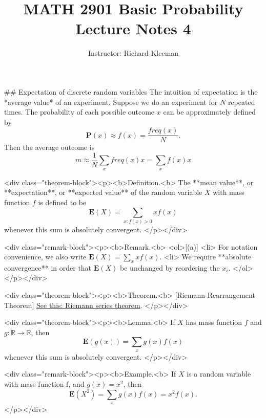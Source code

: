 


\title{MATH 2901 Basic Probability Lecture Notes 4}
\author{Instructor: Richard Kleeman}
\date{}
\maketitle


## Expectation of discrete random variables
The intuition of expectation is the *average value* of an experiment. Suppose we do an experiment for $N$ repeated times. The probability of each possible outcome $x$ can be approximately defined by 
$$\begin{equation}
    \mathbf{P}(x) \approx f(x) = \frac{freq(x)}{N}.
\end{equation}$$
Then the average outcome is
$$\begin{equation}
    m \approx \frac{1}{N}\sum_{x} freq(x)x = \sum_x f(x)x
\end{equation}$$

<div class="theorem-block"><p><b>Definition.<b> 
The **mean value**, or **expectation**, or **expected value** of the random variable $X$ with mass function $f$ is defined to be 
$$\begin{equation}
    \mathbf{E}(X) = \sum_{x:f(x)>0} xf(x)
\end{equation}$$
whenever this sum is absolutely convergent.
</p></div>

<div class="remark-block"><p><b>Remark.<b> 
<ol>[(a)]
    <li> For notation convenience, we also write $\mathbf{E}(X) = \sum_x xf(x)$.
    <li> We require **absolute convergence** in order that $\mathbf{E}(X)$ be unchanged by reordering the $x_i$. 
</ol>
</p></div>

<div class="theorem-block"><p><b>Theorem.<b> [Riemann Rearrangement Theorem] \href{https://en.wikipedia.org/wiki/Riemann_series_theorem}{See this: Riemann series theorem}.
</p></div>

<div class="theorem-block"><p><b>Lemma.<b> 
If $X$ has mass function $f$ and $g:\mathbb{R}\to\mathbb{R}$, then
$$\begin{equation}
    \mathbf{E}(g(x)) = \sum_x g(x) f(x)
\end{equation}$$
whenever this sum is absolutely convergent.
</p></div>

<div class="remark-block"><p><b>Example.<b> 
If $X$ is a random variable with mass function f, and $g(x) = x^2$, then 
$$\begin{equation}
    \mathbf{E}(X^2) = \sum_x g(x)f(x) = x^2 f(x).
\end{equation}$$
</p></div>

